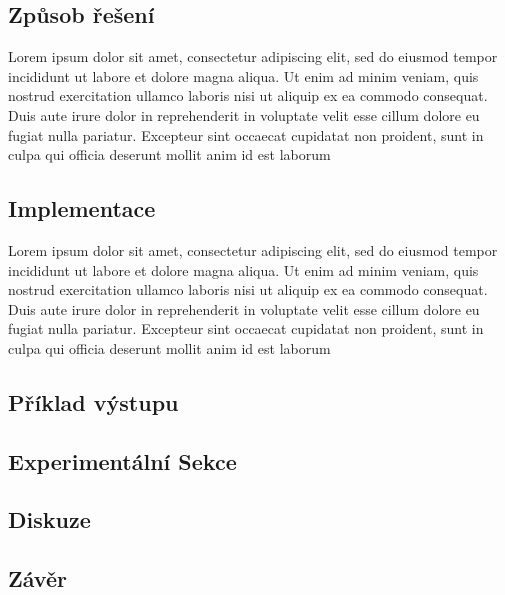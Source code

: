 \documentclass[12pt,a4paper]{article}
\begin{document}
\subsection*{Způsob řešení}
Lorem ipsum dolor sit amet, consectetur adipiscing elit, sed do eiusmod tempor incididunt ut labore et dolore magna aliqua. Ut enim ad minim veniam, quis nostrud exercitation ullamco laboris nisi ut aliquip ex ea commodo consequat. Duis aute irure dolor in reprehenderit in voluptate velit esse cillum dolore eu fugiat nulla pariatur. Excepteur sint occaecat cupidatat non proident, sunt in culpa qui officia deserunt mollit anim id est laborum\par \bigskip

\subsection*{Implementace}
Lorem ipsum dolor sit amet, consectetur adipiscing elit, sed do eiusmod tempor incididunt ut labore et dolore magna aliqua. Ut enim ad minim veniam, quis nostrud exercitation ullamco laboris nisi ut aliquip ex ea commodo consequat. Duis aute irure dolor in reprehenderit in voluptate velit esse cillum dolore eu fugiat nulla pariatur. Excepteur sint occaecat cupidatat non proident, sunt in culpa qui officia deserunt mollit anim id est laborum\par \bigskip

\subsection*{Příklad výstupu}

\subsection*{Experimentální Sekce}

\subsection*{Diskuze}

\subsection*{Závěr}
\end{document}
